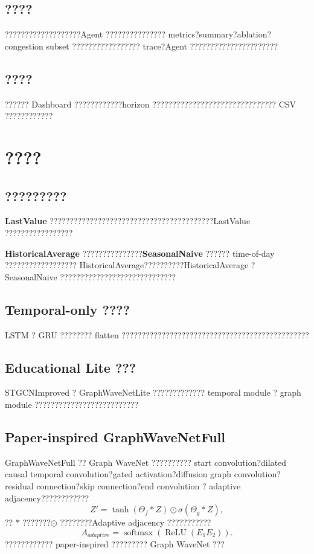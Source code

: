 \documentclass[11pt]{ctexart}
\begin{document}
\subsection{????}
???????????????????Agent ??????????????? metrics?summary?ablation?congestion subset ????????????????? trace?Agent ??????????????????????

\subsection{????}
?????? Dashboard ????????????horizon ??????????????????????????????? CSV ????????????

\section{????}
\subsection{?????????}
\textbf{LastValue} ?????????????????????????????????????????LastValue ?????????????????

\textbf{HistoricalAverage} ???????????????\textbf{SeasonalNaive} ?????? time-of-day ?????????????????? HistoricalAverage??????????HistoricalAverage ? SeasonalNaive ?????????????????????????????

\subsection{Temporal-only ????}
LSTM ? GRU ???????? flatten ???????????????????????????????????????????????

\subsection{Educational Lite ???}
STGCNImproved ? GraphWaveNetLite ????????????? temporal module ? graph module ??????????????????????????

\subsection{Paper-inspired GraphWaveNetFull}
GraphWaveNetFull ?? Graph WaveNet ?????????? start convolution?dilated causal temporal convolution?gated activation?diffusion graph convolution?residual connection?skip connection?end convolution ? adaptive adjacency????????????
\begin{equation}
  Z' = \tanh(\Theta_f * Z) \odot \sigma(\Theta_g * Z),
\end{equation}
?? $*$ ???????$\odot$ ????????Adaptive adjacency ???????????
\begin{equation}
  A_{adaptive}=\operatorname{softmax}(\operatorname{ReLU}(E_1E_2)).
\end{equation}
???????????? paper-inspired ????????? Graph WaveNet ???
\end{document}
